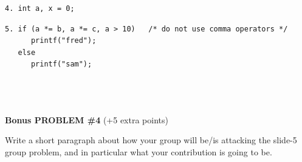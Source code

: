 \begin{verbatim}
4. int a, x = 0;

\end{verbatim}

\begin{verbatim}
5. if (a *= b, a *= c, a > 10)   /* do not use comma operators */
      printf("fred");
   else
      printf("sam");     




\end{verbatim}

\pagebreak

{\bf Bonus PROBLEM \#4} (+5 extra points)

Write a short paragraph about how your group will be/is  attacking the slide-5
group problem, and in particular what your contribution is going to be.

